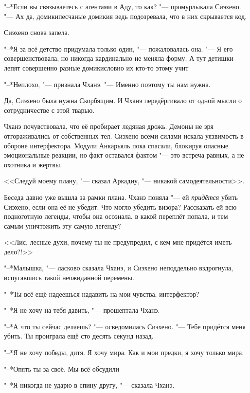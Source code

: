 \spacing

"--*Если вы связываетесь с агентами в Аду, то как? "--- промурлыкала Сиэхено.
"--- Ах да, домики\ldotst песчаные домики\ldotst я ведь подозревала, что в них скрывается код.

Сиэхено снова запела.

"--*Я за всё детство придумала только один, "--- пожаловалась она.
"--- Я его совершенствовала, но никогда кардинально не меняла форму.
А тут детишки лепят совершенно разные домики\ldotst словно их кто-то этому учит\ldotst

"--*Неплохо, "--- признала Чханэ.
"--- Именно поэтому ты нам нужна.

Да, Сиэхено была нужна Скорбящим.
И Чханэ передёргивало от одной мысли о сотрудничестве с этой тварью.

\spacing

Чханэ почувствовала, что её пробирает ледяная дрожь.
Демоны не зря отгораживались от собственных тел.
Сиэхено всеми силами искала уязвимость в обороне интерфектора.
Модули Анкарьяль пока спасали, блокируя опасные эмоциональные реакции, но факт оставался фактом "--- это встреча равных, а не охотника и жертвы.

<<Следуй моему плану, "--- сказал Аркадиу, "--- никакой самодеятельности>>.

Беседа давно уже вышла за рамки плана.
Чханэ поняла "--- ей \emph{придётся} убить Сиэхено, если она её не убедит.
Что могло убедить визора?
Рассказать ей всю подноготную легенды, чтобы она осознала, в какой переплёт попала, и тем самым уничтожить эту самую легенду?

<<Лис, лесные духи, почему ты не предупредил, с кем мне придётся иметь дело?!>>

"--*Малышка, "--- ласково сказала Чханэ, и Сиэхено неподдельно вздрогнула, испугавшись такой неожиданной перемены.

"--*Ты всё ещё надеешься надавить на мои чувства, интерфектор?

"--*Я не хочу на тебя давить, "--- прошептала Чханэ.

"--*А что ты сейчас делаешь? "--- осведомилась Сиэхено.
"--- Тебе придётся меня убить.
Ты проиграла ещё сто десять секунд назад.

"--*Я не хочу победы, дитя.
Я хочу мира.
Как и мои предки, я хочу только мира.

"--*Опять ты за своё.
Мы всё обсудили\ldotst

"--*Я никогда не ударю в спину другу, "--- сказала Чханэ.

